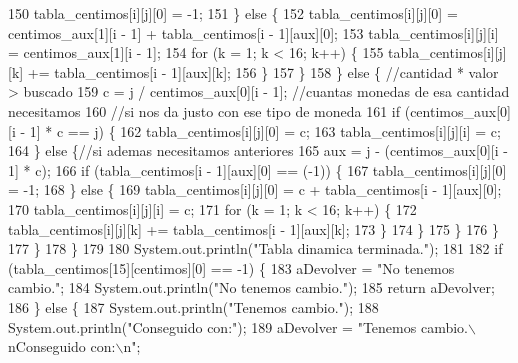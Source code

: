 \begin{DoxyCode}
150                         tabla\_centimos[i][j][0] = -1;
151                     \} \textcolor{keywordflow}{else} \{
152                         tabla\_centimos[i][j][0] = centimos\_aux[1][i - 1] + tabla\_centimos[i - 1][aux][0];
153                         tabla\_centimos[i][j][i] = centimos\_aux[1][i - 1];
154                         \textcolor{keywordflow}{for} (k = 1; k < 16; k++) \{
155                             tabla\_centimos[i][j][k] += tabla\_centimos[i - 1][aux][k];
156                         \}
157                     \}
158                 \} \textcolor{keywordflow}{else} \{ \textcolor{comment}{//cantidad * valor > buscado}
159                     c = j / centimos\_aux[0][i - 1]; \textcolor{comment}{//cuantas monedas de esa cantidad necesitamos}
160                     \textcolor{comment}{//si nos da justo con ese tipo de moneda}
161                     \textcolor{keywordflow}{if} (centimos\_aux[0][i - 1] * c == j) \{
162                         tabla\_centimos[i][j][0] = c;
163                         tabla\_centimos[i][j][i] = c;
164                     \} \textcolor{keywordflow}{else} \{\textcolor{comment}{//si ademas necesitamos anteriores}
165                         aux = j - (centimos\_aux[0][i - 1] * c);
166                         \textcolor{keywordflow}{if} (tabla\_centimos[i - 1][aux][0] == (-1)) \{
167                             tabla\_centimos[i][j][0] = -1;
168                         \} \textcolor{keywordflow}{else} \{
169                             tabla\_centimos[i][j][0] = c + tabla\_centimos[i - 1][aux][0];
170                             tabla\_centimos[i][j][i] = c;
171                             \textcolor{keywordflow}{for} (k = 1; k < 16; k++) \{
172                                 tabla\_centimos[i][j][k] += tabla\_centimos[i - 1][aux][k];
173                             \}
174                         \}
175                     \}
176                 \}
177             \}
178         \}
179         
180         System.out.println(\textcolor{stringliteral}{"Tabla dinamica terminada."});
181         
182         \textcolor{keywordflow}{if} (tabla\_centimos[15][centimos][0] == -1) \{
183             aDevolver = \textcolor{stringliteral}{"No tenemos cambio."};
184             System.out.println(\textcolor{stringliteral}{"No tenemos cambio."});
185             \textcolor{keywordflow}{return} aDevolver;
186         \} \textcolor{keywordflow}{else} \{
187             System.out.println(\textcolor{stringliteral}{"Tenemos cambio."});
188             System.out.println(\textcolor{stringliteral}{"Conseguido con:"});
189             aDevolver = \textcolor{stringliteral}{"Tenemos cambio.\(\backslash\)nConseguido con:\(\backslash\)n"};

\end{DoxyCode}
